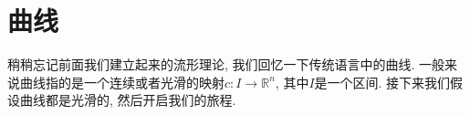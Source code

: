 \chapter{曲线}

稍稍忘记前面我们建立起来的流形理论, 我们回忆一下传统语言中的曲线.
一般来说曲线指的是一个连续或者光滑的映射$c:I\to\mathbb{R}^n$, 其中$I$是一个区间.
接下来我们假设曲线都是光滑的, 然后开启我们的旅程.